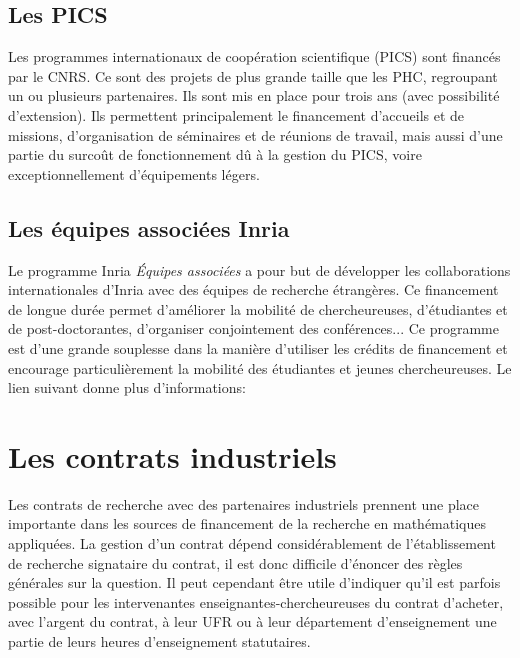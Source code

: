 \subsection{Les PICS} \label{PICS}
Les programmes internationaux de coop\'eration scientifique (PICS)
sont financ\'es par le CNRS.
Ce sont des projets de plus grande taille que les PHC, regroupant un
ou plusieurs partenaires. Ils sont mis en place pour trois ans (avec
possibilit\'e d'extension). Ils permettent principalement le
financement d'accueils et de missions, d'organisation de
s\'eminaires et de r\'eunions de travail, mais aussi d'une partie du
surco\^ut de fonctionnement d\^u \`a la gestion du PICS, voire
exceptionnellement d'\'equipements l\'egers. \\

\subsection{Les \'equipes associ\'ees Inria}
Le programme Inria \textit{\'Equipes associ\'ees} a pour but de d\'evelopper les collaborations internationales
d'Inria avec des \'equipes de recherche \'etrang\`eres.
Ce financement de  longue dur\'ee permet d'am\'eliorer la mobilit\'e de chercheur\mp euse\mp s,
d'\'etudiant\mp e\mp s et de post-doctorant\mp e\mp s, d'organiser conjointement  des conf\'erences...
Ce programme est d'une grande souplesse dans la mani\`ere d'utiliser les cr\'edits de financement et
 encourage particuli\`erement la mobilit\'e des \'etudiant\mp e\mp s et jeunes chercheur\mp euse\mp s. Le lien suivant donne plus d'informations: \\ 

\section{Les contrats industriels}
Les contrats de recherche avec des partenaires industriels prennent
une place importante dans les sources de financement de la recherche en
math\'ematiques appliqu\'ees. La gestion d'un contrat d\'epend
consid\'erablement de l'\'etablissement de recherche signataire du
contrat, il est donc difficile d'\'enoncer des r\`egles
g\'en\'erales sur la question. Il peut cependant \^etre utile d'indiquer
qu'il est parfois possible pour les intervenant\mp e\mp s
enseignant\mp e\mp s-chercheur\mp euse\mp s du contrat d'acheter, avec l'argent du
contrat, \`a leur UFR ou \`a leur d\'epartement d'enseignement une
partie de leurs heures d'enseignement statutaires.



